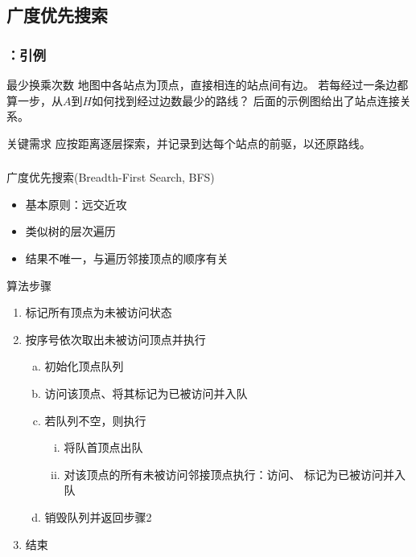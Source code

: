 \subsection{广度优先搜索}

\begin{frame}
    \frametitle{\insertsubsectionhead：引例}
    \begin{exampleblock}{最少换乘次数}
        地图中各站点为顶点，直接相连的站点间有边。
        若每经过一条边都算一步，从$A$到$H$如何找到经过边数最少的路线？
        后面的示例图给出了站点连接关系。
    \end{exampleblock}
    \begin{block}{关键需求}
        应按距离逐层探索，并记录到达每个站点的前驱，以还原路线。
    \end{block}
\end{frame}

\begin{frame}
    \frametitle{\insertsubsectionhead}
    \begin{block}{广度优先搜索(Breadth-First Search, BFS)}
        \begin{itemize}
            \item 基本原则：远交近攻
            \item 类似树的层次遍历
            \item 结果不唯一，与遍历邻接顶点的顺序有关
        \end{itemize}
    \end{block}
    \begin{alertblock}{算法步骤}
        \begin{enumerate}
            \item 标记所有顶点为\alert{未被访问}状态
            \item 按序号依次取出\alert{未被访问}顶点并执行
                  \begin{enumerate}[a.]
                      \item 初始化顶点队列
                      \item 访问该顶点、将其标记为\alert{已被访问}并入队
                      \item 若队列不空，则执行
                            \begin{enumerate}[i.]
                                \item 将队首顶点出队
                                \item 对该顶点的所有未被访问邻接顶点执行：访问、
                                      标记为\alert{已被访问}并入队
                            \end{enumerate}
                      \item 销毁队列并返回步骤2
                  \end{enumerate}
            \item 结束
        \end{enumerate}
    \end{alertblock}
\end{frame}

